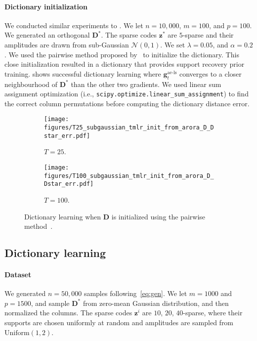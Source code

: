 \documentclass[10pt]{article} %
\newcommand{\D}{{\bm D}}
\newcommand{\z}{{\bm z}}
\newcommand{\g}{{\bm g}}
\begin{document}
\paragraph{Dictionary initialization} We conducted similar experiments to . We let $n=10{,}000$, $m=100$, and $p=100$. We generated an orthogonal $\D^{\ast}$. The sparse codes $\z^{\ast}$ are $5$-sparse and their amplitudes are drawn from sub-Gaussian $\mathcal{N}(0, 1)$. We set $\lambda=0.05$, and $\alpha = 0.2$. We used the pairwise method proposed by~\citet{arora2015sparsecoding} to initialize the dictionary. This close initialization resulted in a dictionary that provides support recovery prior training.  shows successful dictionary learning where $\g_t^{\text{ae-ls}}$ converges to a closer neighbourhood of $\D^{\ast}$ than the other two gradients. We used linear sum assignment optimization (i.e., \texttt{scipy.optimize.linear\_sum\_assignment}) to find the correct column permutations before computing the dictionary distance error.
%
\begin{figure}[h]
	\centering
	\begin{subfigure}[t]{0.42\linewidth}
	\centering
	\texttt{[image: figures/T25\_subgaussian\_tmlr\_init\_from\_arora\_D\_Dstar\_err.pdf]}
	  \caption{$T=25$.}
  	\label{fig:dl_25_initarora}
	\end{subfigure}
	\begin{subfigure}[t]{0.42\linewidth}
	\centering
	\texttt{[image: figures/T100\_subgaussian\_tmlr\_init\_from\_arora\_D\_Dstar\_err.pdf]}
	  \caption{$T=100$.}
  	\label{fig:dl_100_initarora}
	\end{subfigure}
    \caption{Dictionary learning when $\D$ is initialized using the pairwise method~\citet{arora2015sparsecoding}.}
	\label{fig:dl_initarora}
\end{figure}
%
\subsection{Dictionary learning}
%
\paragraph{Dataset} We generated $n\!=\!50{,}000$ samples following~\eqref{eq:gen}. We let $m\!=\!1000$ and $p\!=\!1500$, and sample $\D^{\ast}$ from zero-mean Gaussian distribution, and then normalized the columns. The sparse codes $\z^i$ are $10$, $20$, $40$-sparse, where their supports are chosen uniformly at random and amplitudes are sampled from $\text{Uniform}(1,2)$.
%
\end{document}
